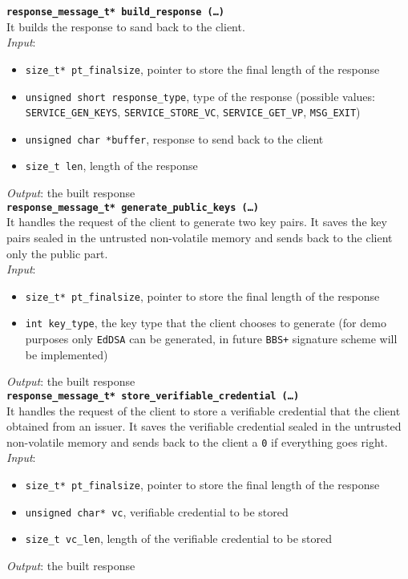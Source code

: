 \noindent
\texttt{\bfseries response\_message\_t* build\_response (\dots)}\\
It builds the response to sand back to the client. \\
\textit{Input}:
\begin{itemize}[noitemsep,nolistsep]
\item \texttt{size\_t* pt\_finalsize}, pointer to store the final length of the response
\item \texttt{unsigned short response\_type}, type of the response (possible values: \texttt{SERVICE\_\-GEN\_KEYS}, \texttt{SERVICE\_STORE\_VC}, \texttt{SERVICE\_GET\_VP}, \texttt{MSG\_EXIT})
\item \texttt{unsigned char *buffer}, response to send back to the client
\item \texttt{size\_t len}, length of the response
\end{itemize}
\textit{Output}: the built response \\


\noindent
\texttt{\bfseries response\_message\_t* generate\_public\_keys (\dots)}\\
It handles the request of the client to generate two key pairs. It saves the key pairs sealed in the untrusted non-volatile memory and sends back to the client only the public part. \\ 
\textit{Input}:
\begin{itemize}[noitemsep,nolistsep]
\item \texttt{size\_t* pt\_finalsize}, pointer to store the final length of the response
\item \texttt{int key\_type}, the key type that the client chooses to generate (for demo purposes only \texttt{EdDSA} can be generated, in future \texttt{BBS+} signature scheme will be implemented)
\end{itemize}
\textit{Output}: the built response \\

\noindent
\texttt{\bfseries response\_message\_t* store\_verifiable\_credential (\dots)}\\
It handles the request of the client to store a verifiable credential that the client obtained from an issuer. It saves the verifiable credential sealed in the untrusted non-volatile memory and sends back to the client a \texttt{0} if everything goes right. \\
\textit{Input}:
\begin{itemize}[noitemsep,nolistsep]
  \item \texttt{size\_t* pt\_finalsize}, pointer to store the final length of the response
  \item \texttt{unsigned char* vc}, verifiable credential to be stored
  \item \texttt{size\_t vc\_len}, length of the verifiable credential to be stored
\end{itemize}
\textit{Output}: the built response \\

